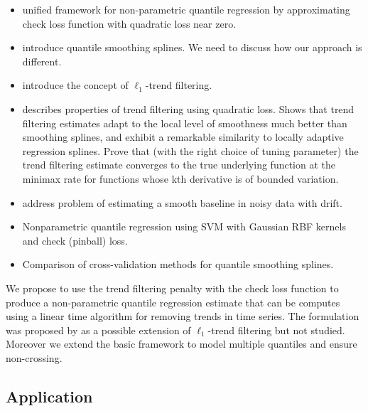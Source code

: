\documentclass[12pt]{article}
\numberwithin{equation}{section}
\theoremstyle{plain}
\begin{document}
\begin{itemize}
\item \cite{Oh2011} unified framework for non-parametric quantile regression by approximating check loss function with quadratic loss near zero.
\item \cite{KoenkerNgPortnoy1994} introduce quantile smoothing splines. We need to discuss how our approach is different.
\item \cite{Kim2009} introduce the concept of $\ell_1$-trend filtering.
\item \cite{Tib2014} describes properties of trend filtering using quadratic loss. Shows that trend filtering estimates adapt to the local level of smoothness much better than smoothing splines, and exhibit a remarkable similarity to locally adaptive regression splines. Prove that (with the right choice of tuning parameter) the trend filtering estimate
converges to the true underlying function at the minimax rate for functions whose kth derivative is of bounded variation.
\item \cite{Ning2014} address problem of estimating a smooth baseline in noisy data with drift.
\item \cite{Takeuchi2006nonparametric} Nonparametric quantile regression using SVM with Gaussian RBF kernels and check (pinball) loss. 
\item \cite{yuan2006gacv} Comparison of cross-validation methods for quantile smoothing splines.  
\end{itemize}
We propose to use the trend filtering penalty with the check loss function to produce a non-parametric quantile regression estimate that can be computes using a linear time algorithm for removing trends in time series. The formulation was proposed by \cite{Kim2009} as a possible extension of $\ell_1$-trend filtering but not studied. Moreover we extend the basic framework to model multiple quantiles and ensure non-crossing. 

\subsection{Application}
\end{document}
